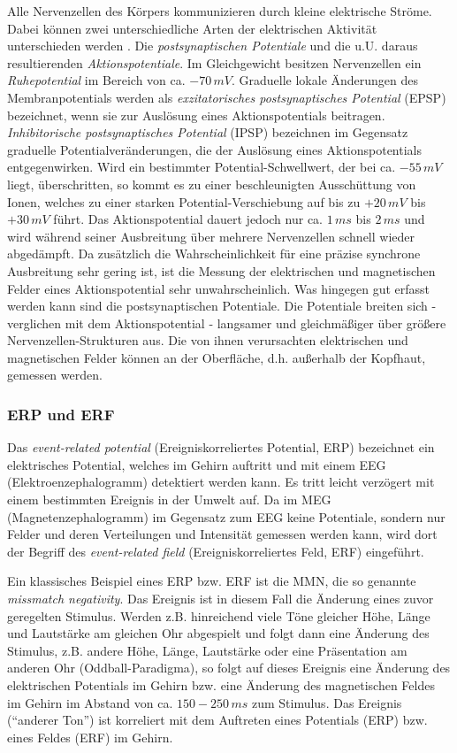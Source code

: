 \documentclass[doc,a4paper,12pt]{apa6}
\begin{document}
Alle Nervenzellen des Körpers kommunizieren durch kleine elektrische Ströme. Dabei können zwei unterschiedliche Arten der elektrischen Aktivität unterschieden werden \parencite{da1998biophysical}. Die \emph{postsynaptischen Potentiale} und die u.U. daraus resultierenden \emph{Aktionspotentiale}. Im Gleichgewicht besitzen Nervenzellen ein \emph{Ruhepotential} im Bereich von ca. $-70\,mV$. Graduelle lokale Änderungen des Membranpotentials werden als \emph{exzitatorisches postsynaptisches Potential} (EPSP) bezeichnet, wenn sie zur Auslösung eines Aktionspotentials beitragen. \emph{Inhibitorische postsynaptisches Potential} (IPSP) bezeichnen im Gegensatz graduelle Potentialveränderungen, die der Auslösung eines Aktionspotentials entgegenwirken. Wird ein bestimmter Potential-Schwellwert, der bei ca. $-55\,mV$ liegt, überschritten, so kommt es zu einer beschleunigten Ausschüttung von Ionen, welches zu einer starken Potential-Verschiebung auf bis zu $+20\,mV$ bis $+30\,mV$ führt. Das Aktionspotential dauert jedoch nur ca. $1\,ms$ bis $2\,ms$ und wird während seiner Ausbreitung über mehrere Nervenzellen schnell wieder abgedämpft. Da zusätzlich die Wahrscheinlichkeit für eine präzise synchrone Ausbreitung sehr gering ist, ist die Messung der elektrischen und magnetischen Felder eines Aktionspotential sehr unwahrscheinlich. Was hingegen gut erfasst werden kann sind die postsynaptischen Potentiale. Die Potentiale breiten sich - verglichen mit dem Aktionspotential - langsamer und gleichmäßiger über größere Nervenzellen-Strukturen aus. Die von ihnen verursachten elektrischen und magnetischen Felder können an der Oberfläche, d.h. außerhalb der Kopfhaut, gemessen werden.

\subsubsection{ERP und ERF}
\label{sec:erf}

Das \emph{event-related potential} (Ereigniskorreliertes Potential, ERP) bezeichnet ein elektrisches Potential, welches im Gehirn auftritt und mit einem EEG (Elektroenzephalogramm) detektiert werden kann. Es tritt leicht verzögert mit einem bestimmten Ereignis in der Umwelt auf. Da im MEG (Magnetenzephalogramm) im Gegensatz zum EEG keine Potentiale, sondern nur Felder und deren Verteilungen und Intensität gemessen werden kann, wird dort der Begriff des \emph{event-related field} (Ereigniskorreliertes Feld, ERF) eingeführt.

Ein klassisches Beispiel eines ERP bzw. ERF ist die MMN, die so genannte \emph{missmatch negativity}. Das Ereignis ist in diesem Fall die Änderung eines zuvor geregelten Stimulus. Werden z.B. hinreichend viele Töne gleicher Höhe, Länge und Lautstärke am gleichen Ohr abgespielt und folgt dann eine Änderung des Stimulus, z.B. andere Höhe, Länge, Lautstärke oder eine Präsentation am anderen Ohr (Oddball-Paradigma), so folgt auf dieses Ereignis eine Änderung des elektrischen Potentials im Gehirn bzw. eine Änderung des magnetischen Feldes im Gehirn im Abstand von ca. $150-250\,ms$ zum Stimulus. Das Ereignis (``anderer Ton'') ist korreliert mit dem Auftreten eines Potentials (ERP) bzw. eines Feldes (ERF) im Gehirn.
\end{document}
